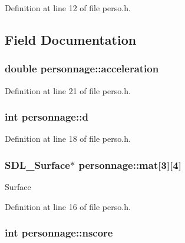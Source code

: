 Definition at line 12 of file perso.\+h.



\subsection{Field Documentation}
\subsubsection[{\texorpdfstring{acceleration}{acceleration}}]{\setlength{\rightskip}{0pt plus 5cm}double personnage\+::acceleration}\hypertarget{structpersonnage_aa3dc1bee3cdaa742eac0d46f56ac8908}{}\label{structpersonnage_aa3dc1bee3cdaa742eac0d46f56ac8908}


Definition at line 21 of file perso.\+h.

\subsubsection[{\texorpdfstring{d}{d}}]{\setlength{\rightskip}{0pt plus 5cm}int personnage\+::d}\hypertarget{structpersonnage_ad3316ca5e21971af05da3b10b0d18fb3}{}\label{structpersonnage_ad3316ca5e21971af05da3b10b0d18fb3}


Definition at line 18 of file perso.\+h.

\subsubsection[{\texorpdfstring{mat}{mat}}]{\setlength{\rightskip}{0pt plus 5cm}S\+D\+L\+\_\+\+Surface$\ast$ personnage\+::mat\mbox{[}3\mbox{]}\mbox{[}4\mbox{]}}\hypertarget{structpersonnage_a7e7c398ea690ec57a5fce13c80386cd4}{}\label{structpersonnage_a7e7c398ea690ec57a5fce13c80386cd4}
Surface 

Definition at line 16 of file perso.\+h.

\subsubsection[{\texorpdfstring{nscore}{nscore}}]{\setlength{\rightskip}{0pt plus 5cm}int personnage\+::nscore}\hypertarget{structpersonnage_a6c5c952d4dc96ed7f6be22480cb5a4d0}{}\label{structpersonnage_a6c5c952d4dc96ed7f6be22480cb5a4d0}


